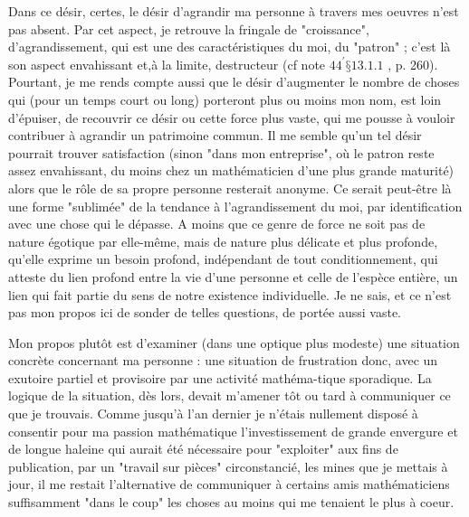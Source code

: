 Dans ce désir, certes, le désir d'agrandir ma personne à travers mes oeuvres n'est pas absent. Par cet aspect, je retrouve la fringale de "croissance", d'agrandissement, qui est une des caractéristiques du moi, du "patron" ; c’est là son aspect envahissant et,à la limite, destructeur (cf note \({44}^{\prime }§{13.1.1}\) , p. 260). Pourtant, je me rends compte aussi que le désir d'augmenter le nombre de choses qui (pour un temps court ou long) porteront plus ou moins mon nom, est loin d'épuiser, de recouvrir ce désir ou cette force plus vaste, qui me pousse à vouloir contribuer à agrandir un patrimoine commun. Il me semble qu'un tel désir pourrait trouver satisfaction (sinon "dans mon entreprise", où le patron reste assez envahissant, du moins chez un mathématicien d'une plus grande maturité) alors que le rôle de sa propre personne resterait anonyme. Ce serait peut-être là une forme "sublimée" de la tendance à l'agrandissement du moi, par identification avec une chose qui le dépasse. A moins que ce genre de force ne soit pas de nature égotique par elle-même, mais de nature plus délicate et plus profonde, qu'elle exprime un besoin profond, indépendant de tout conditionnement, qui atteste du lien profond entre la vie d'une personne et celle de l'espèce entière, un lien qui fait partie du sens de notre existence individuelle. Je ne sais, et ce n'est pas mon propos ici de sonder de telles questions, de portée aussi vaste.

Mon propos plutôt est d'examiner (dans une optique plus modeste) une situation concrète concernant ma personne : une situation de frustration donc, avec un exutoire partiel et provisoire par une activité mathéma-tique sporadique. La logique de la situation, dès lors, devait m'amener tôt ou tard à communiquer ce que je trouvais. Comme jusqu'à l'an dernier je n'étais nullement disposé à consentir pour ma passion mathématique l'investissement de grande envergure et de longue haleine qui aurait été nécessaire pour "exploiter" aux fins de publication, par un "travail sur pièces" circonstancié, les mines que je mettais à jour, il me restait l'alternative de communiquer à certains amis mathématiciens suffisamment "dans le coup" les choses au moins qui me tenaient le plus à coeur.

